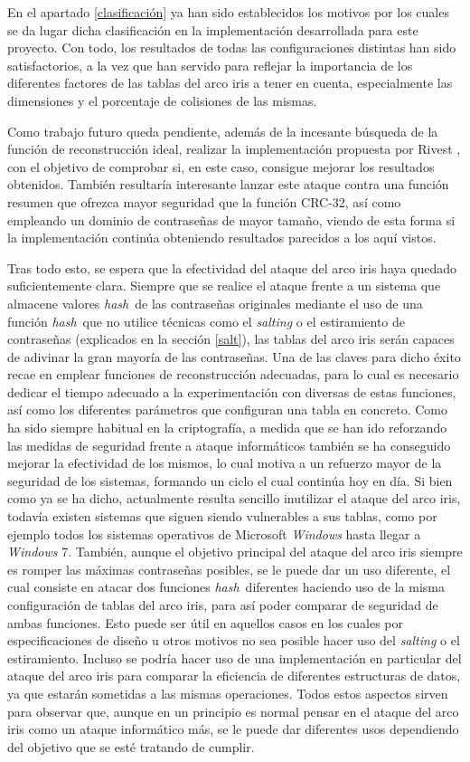 \documentclass[12pt,spanish,listoffigures,listoftables]{tfgetsinf}
\newcommand{\hash}{\textit{hash}}
\begin{document}
En el apartado \ref{clasificación} ya han sido establecidos los motivos por los cuales se da lugar dicha clasificación en la implementación desarrollada para este proyecto. Con todo, los resultados de todas las configuraciones distintas han sido satisfactorios, a la vez que han servido para reflejar la importancia de los diferentes factores de las tablas del arco iris a tener en cuenta, especialmente las dimensiones y el porcentaje de colisiones de las mismas.

Como trabajo futuro queda pendiente, además de la incesante búsqueda de la función de reconstrucción ideal, realizar la implementación propuesta por Rivest \cite{rivest}, con el objetivo de comprobar si, en este caso, consigue mejorar los resultados obtenidos. También resultaría interesante lanzar este ataque contra una función resumen que ofrezca mayor seguridad que la función CRC-32, así como empleando un dominio de contraseñas de mayor tamaño, viendo de esta forma si la implementación continúa obteniendo resultados parecidos a los aquí vistos.

Tras todo esto, se espera que la efectividad del ataque del arco iris haya quedado suficientemente clara. Siempre que se realice el ataque frente a un sistema que almacene valores \hash~de las contraseñas originales mediante el uso de una función \hash~que no utilice técnicas como el \textit{salting} o el estiramiento de contraseñas (explicados en la sección \ref{salt}), las tablas del arco iris serán capaces de adivinar la gran mayoría de las contraseñas. Una de las claves para dicho éxito recae en emplear funciones de reconstrucción adecuadas, para lo cual es necesario dedicar el tiempo adecuado a la experimentación con diversas de estas funciones, así como los diferentes parámetros que configuran una tabla en concreto. Como ha sido siempre habitual en la criptografía, a medida que se han ido reforzando las medidas de seguridad frente a ataque informáticos también se ha conseguido mejorar la efectividad de los mismos, lo cual motiva a un refuerzo mayor de la seguridad de los sistemas, formando un ciclo el cual continúa hoy en día. Si bien como ya se ha dicho, actualmente resulta sencillo inutilizar el ataque del arco iris, todavía existen sistemas que siguen siendo vulnerables a sus tablas, como por ejemplo todos los sistemas operativos de Microsoft \textit{Windows} hasta llegar a \textit{Windows} 7. También, aunque el objetivo principal del ataque del arco iris siempre es romper las máximas contraseñas posibles, se le puede dar un uso diferente, el cual consiste en atacar dos funciones \hash~diferentes haciendo uso de la misma configuración de tablas del arco iris, para así poder comparar de seguridad de ambas funciones. Esto puede ser útil en aquellos casos en los cuales por especificaciones de diseño u otros motivos no sea posible hacer uso del \textit{salting} o el estiramiento. Incluso se podría hacer uso de una implementación en particular del ataque del arco iris para comparar la eficiencia de diferentes estructuras de datos, ya que estarán sometidas a las mismas operaciones. Todos estos aspectos sirven para observar que, aunque en un principio es normal pensar en el ataque del arco iris como un ataque informático más, se le puede dar diferentes usos dependiendo del objetivo que se esté tratando de cumplir.
\end{document}
